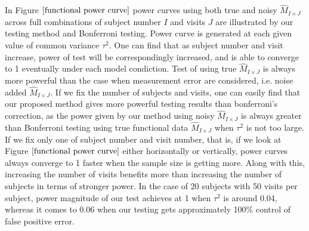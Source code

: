 In Figure $\ref{functional power curve}$ power curves using both true and noisy $\hat{M}_{I\times J}$ across full combinations of subject number $I$ and visits $J$ are illustrated by our testing method and Bonferroni testing. Power curve is generated at each given value of common variance $\tau^2$. One can find that as subject number and visit increase, power of test will be correspondingly increased, and is able to converge to 1 eventually under each model condiction. Test of using true $\hat{M}_{I\times J}$ is always more powerful than the case when measurement error are considered, i.e. noise added $\hat{M}_{I\times J}$. If we fix the number of subjects and visits, one can easily find that our proposed method gives more powerful testing results than bonferroni's correction, as the power given by our method using noisy $\hat{M}_{I\times J}$ is always greater than Bonferroni testing using true functional data $\hat{M}_{I\times J}$ when $\tau^2$ is not too large. If we fix only one of subject number and visit number, that is, if we look at Figure $\ref{functional power curve}$ either horizontally or vertically, power curves always converge to 1 faster when the sample size is getting more. Along with this, increasing the number of visits benefits more than increasing the number of subjects in terms of stronger power. In the case of 20 subjects with 50 visits per subject, power magnitude of our test achieves at 1 when $\tau^2$ is around 0.04, whereas it comes to 0.06 when our testing gets approximately 100\% control of false positive error.



